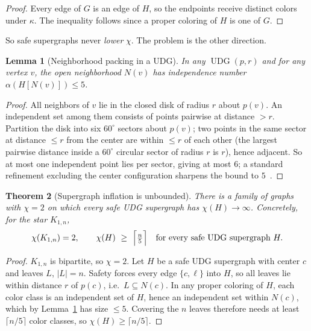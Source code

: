 \documentclass[11pt]{article}
\newtheorem{theorem}{Theorem}[section]
\newtheorem{lemma}[theorem]{Lemma}
\theoremstyle{definition}
\theoremstyle{remark}
\newcommand{\UDG}{\operatorname{UDG}}
\newcommand{\indep}{\alpha}
\begin{document}
\begin{proof}
Every edge of $G$ is an edge of $H$, so the endpoints receive distinct colors under
$\kappa$. The inequality follows since a proper coloring of $H$ is one of $G$.
\end{proof}

So safe supergraphs never \emph{lower} $\chi$. The problem is the other direction.

\begin{lemma}[Neighborhood packing in a UDG]
\label{lem:packing}
In any $\UDG(p,r)$ and for any vertex $v$, the open neighborhood $N(v)$ has independence
number $\indep(H[N(v)])\le 5$.
\end{lemma}

\begin{proof}
All neighbors of $v$ lie in the closed disk of radius $r$ about $p(v)$. An independent
set among them consists of points pairwise at distance $>r$. Partition the disk into six
$60^\circ$ sectors about $p(v)$; two points in the same sector at distance $\le r$ from
the center are within $\le r$ of each other (the largest pairwise distance inside a
$60^\circ$ circular sector of radius $r$ is $r$), hence adjacent. So at most one
independent point lies per sector, giving at most $6$; a standard refinement excluding
the center configuration sharpens the bound to $5$~\cite{Heppes2003}.
\end{proof}

\begin{theorem}[Supergraph inflation is unbounded]
\label{thm:impossibility}
There is a family of graphs with $\chi=2$ on which every safe UDG supergraph has
$\chi(H)\to\infty$. Concretely, for the star $K_{1,n}$,
\[
  \chi(K_{1,n}) = 2, \qquad \chi(H)\ \ge\ \Bigl\lceil \tfrac{n}{5}\Bigr\rceil
  \quad\text{for every safe UDG supergraph } H.
\]
\end{theorem}

\begin{proof}
$K_{1,n}$ is bipartite, so $\chi=2$. Let $H$ be a safe UDG supergraph with center $c$
and leaves $L$, $|L|=n$. Safety forces every edge $\{c,\ell\}$ into $H$, so all leaves
lie within distance $r$ of $p(c)$, i.e.\ $L\subseteq N(c)$. In any proper coloring of
$H$, each color class is an independent set of $H$, hence an independent set within
$N(c)$, which by Lemma~\ref{lem:packing} has size $\le 5$. Covering the $n$ leaves
therefore needs at least $\lceil n/5\rceil$ color classes, so $\chi(H)\ge\lceil
n/5\rceil$.
\end{proof}
\end{document}
